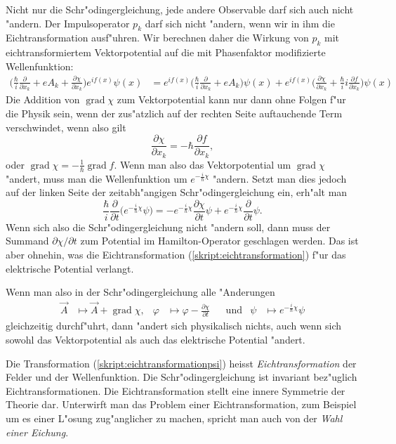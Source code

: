 Nicht nur die Schr"odingergleichung, jede andere Observable darf sich
auch nicht "andern.
Der Impulsoperator $p_k$ darf sich nicht "andern, wenn wir in ihm die
Eichtransformation ausf"uhren.
Wir berechnen daher die Wirkung von $p_k$ mit eichtransformiertem
Vektorpotential auf die mit Phasenfaktor modifizierte Wellenfunktion:
\begin{align*}
\biggl(
\frac{\hbar}{i}\frac{\partial}{\partial x_k}+eA_k
+\frac{\partial\chi}{\partial x_k}
\biggr)e^{if(x)}\psi(x)
&=
e^{if(x)}
\biggl(
\frac{\hbar}{i}\frac{\partial}{\partial x_k}+eA_k
\biggr)\psi(x)
+
e^{if(x)}
\biggl(
\frac{\partial\chi}{\partial x_k}
+
\frac{\hbar}{i}i\frac{\partial f}{\partial x_k}
\biggr)
\psi(x)
\end{align*}
Die Addition von $\operatorname{grad}\chi$ zum Vektorpotential
kann nur dann ohne Folgen f"ur die Physik sein, wenn der
zus"atzlich auf der rechten Seite auftauchende Term verschwindet,
wenn also gilt
\[
\frac{\partial\chi}{\partial x_k}=-\hbar\frac{\partial f}{\partial x_k},
\]
oder $\operatorname{grad}\chi=-\frac1{\hbar}\operatorname{grad}f$.
Wenn man also das Vektorpotential um $\operatorname{grad}\chi$ "andert,
muss man die Wellenfunktion um $e^{-\frac{i}{\hbar}\chi}$ "andern. 
Setzt man dies jedoch auf der linken Seite der zeitabh"angigen
Schr"odingergleichung ein, erh"alt man
\[
\frac{\hbar}{i}\frac{\partial}{\partial t}
\bigl(
e^{-\frac{i}{\hbar}\chi}
\psi
\bigr)
=
-
e^{-\frac{i}{\hbar}\chi}
\frac{\partial\chi}{\partial t}
\psi
+
e^{-\frac{i}{\hbar}\chi}
\frac{\partial}{\partial t}
\psi.
\]
Wenn sich also die Schr"odingergleichung nicht "andern soll, dann
muss der Summand $\partial\chi/\partial t$ zum Potential im
Hamilton-Operator geschlagen werden.
Das ist aber ohnehin, was die Eichtransformation (\ref{skript:eichtransformation})
f"ur das elektrische Potential verlangt.

Wenn man also in der Schr"odingergleichung alle "Anderungen
\begin{equation}
\begin{aligned}
\vec A&\mapsto \vec A + \operatorname{grad}\chi,
&
\varphi&\mapsto \varphi-\frac{\partial\chi}{\partial t}
&
&\text{und}&
\psi
&\mapsto
e^{-\frac{i}{\hbar}\chi}\psi
\label{skript:eichtransformationpsi}
\end{aligned}
\end{equation}
gleichzeitig durchf"uhrt, dann "andert sich physikalisch nichts,
auch wenn sich sowohl das Vektorpotential als auch das
elektrische Potential "andert.

Die Transformation (\ref{skript:eichtransformationpsi}) heisst 
{\em Eichtransformation} der Felder und der Wellenfunktion.
Die Schr"odingergleichung ist invariant bez"uglich Eichtransformationen.
Die Eichtransformation stellt eine innere Symmetrie der Theorie dar.
Unterwirft man das Problem einer Eichtransformation, zum Beispiel um
es einer L"osung zug"anglicher zu machen, spricht man auch von der {\em Wahl
einer Eichung}.





